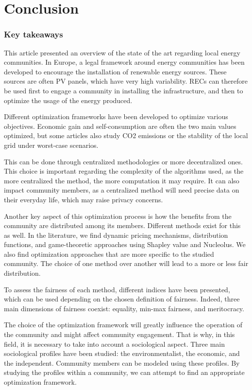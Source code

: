 \documentclass[12pt,a4paper]{article}
\begin{document}
\section{Conclusion}

\subsubsection*{Key takeaways}

This article presented an overview of the state of the art regarding local energy communities. In Europe, a legal framework around energy communities has been developed to encourage the installation of renewable energy sources. These sources are often PV panels, which have very high variability. RECs can therefore be used first to engage a community in installing the infrastructure, and then to optimize the usage of the energy produced.

Different optimization frameworks have been developed to optimize various objectives. Economic gain and self-consumption are often the two main values optimized, but some articles also study CO2 emissions or the stability of the local grid under worst-case scenarios.

This can be done through centralized methodologies or more decentralized ones. This choice is important regarding the complexity of the algorithms used, as the more centralized the method, the more computation it may require. It can also impact community members, as a centralized method will need precise data on their everyday life, which may raise privacy concerns.

Another key aspect of this optimization process is how the benefits from the community are distributed among its members. Different methods exist for this as well. In the literature, we find dynamic pricing mechanisms, distribution functions, and game-theoretic approaches using Shapley value and Nucleolus. We also find optimization approaches that are more specific to the studied community. The choice of one method over another will lead to a more or less fair distribution.

To assess the fairness of each method, different indices have been presented, which can be used depending on the chosen definition of fairness. Indeed, three main dimensions of fairness coexist: equality, min-max fairness, and meritocracy.

The choice of the optimization framework will greatly influence the operation of the community and might affect community engagement. That is why, in this field, it is necessary to take into account a sociological aspect. Three main sociological profiles have been studied: the environmentalist, the economic, and the independent. Community members can be modeled using these profiles. By studying the profiles within a community, we can attempt to find an appropriate optimization framework.
\end{document}
